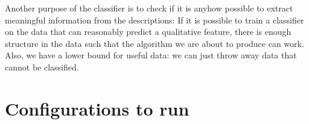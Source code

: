 Another purpose of the classifier is to check if it is anyhow possible to extract meaningful information from the descriptions: If it is possible to train a classifier on the data that can reasonably predict a qualitative feature, there is enough structure in the data such that the algorithm we are about to produce can work. Also, we have a lower bound for useful data: we can just throw away data that cannot be classified.





\section{Configurations to run \cite{Derrac2015, Ager2018}}
\label{ap:yamls_for_origalgos}

